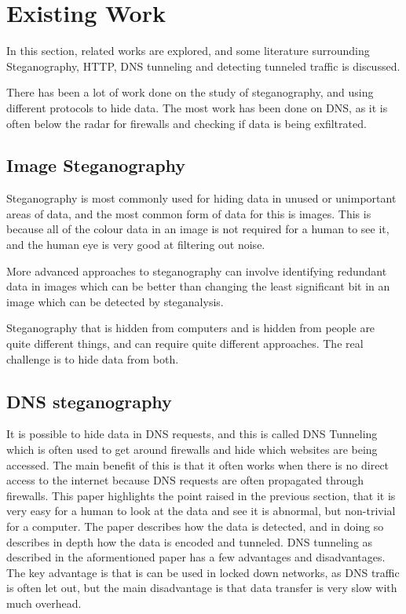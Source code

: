 \section{Existing Work}
In this section, related works are explored, and some literature surrounding Steganography, HTTP, DNS tunneling and detecting tunneled traffic is discussed.

There has been a lot of work done on the study of steganography, and using different protocols to hide data. The most work has been done on DNS, as it is often below the radar for firewalls and checking if data is being exfiltrated.
\subsection{Image Steganography}
Steganography is most commonly used for hiding data in unused or unimportant areas of data\cite{exploringsteno}, and the most common form of data for this is images. This is because all of the colour data in an image is not required for a human to see it, and the human eye is very good at filtering out noise\cite{exploringsteno}.

More advanced approaches to steganography can involve identifying redundant data in images\cite{introsteno} which can be better than changing the least significant bit in an image which can be detected by steganalysis\cite{introsteno}.

Steganography that is hidden from computers and is hidden from people are quite different things, and can require quite different approaches. The real challenge is to hide data from both\cite{introsteno}.

\subsection{DNS steganography}
It is possible to hide data in DNS requests, and this is called DNS Tunneling which is often used to get around firewalls and hide which websites are being accessed\cite{detectingdns}. The main benefit of this is that it often works when there is no direct access to the internet because DNS requests are often propagated through firewalls.
This paper highlights the point raised in the previous section, that it is very easy for a human to look at the data and see it is abnormal, but non-trivial for a computer.
The paper describes how the data is detected, and in doing so describes in depth how the data is encoded and tunneled.
DNS tunneling as described in the aformentioned paper has a few advantages and disadvantages.
The key advantage is that is can be used in locked down networks, as DNS traffic is often let out, but the main disadvantage is that data transfer is very slow with much overhead.


